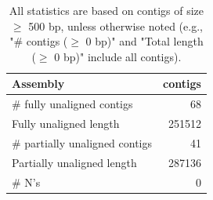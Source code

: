 \documentclass[12pt,a4paper]{article}
\begin{document}
\begin{table}[ht]
\begin{center}
\caption{All statistics are based on contigs of size $\geq$ 500 bp, unless otherwise noted (e.g., "\# contigs ($\geq$ 0 bp)" and "Total length ($\geq$ 0 bp)" include all contigs).}
\begin{tabular}{|l*{1}{|r}|}
\hline
Assembly & contigs \\ \hline
\# fully unaligned contigs & 68 \\ \hline
Fully unaligned length & 251512 \\ \hline
\# partially unaligned contigs & 41 \\ \hline
Partially unaligned length & 287136 \\ \hline
\# N's & 0 \\ \hline
\end{tabular}
\end{center}
\end{table}
\end{document}
